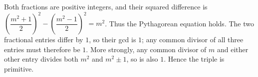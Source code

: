 Both fractions are positive integers, and their squared difference is $\left(\dfrac{m^2+1}{2}\right)^2-\left(\dfrac{m^2-1}{2}\right)^2=m^2$. Thus the Pythagorean equation holds. The two fractional entries differ by $1$, so their gcd is $1$; any common divisor of all three entries must therefore be $1$. More strongly, any common divisor of $m$ and either other entry divides both $m^2$ and $m^2\pm1$, so is also $1$. Hence the triple is primitive.
